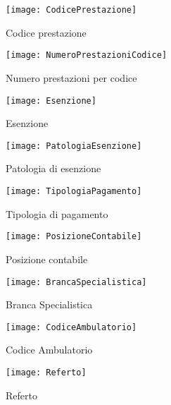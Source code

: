 \documentclass[paper=a4, fontsize=11pt]{scrartcl} %
\numberwithin{equation}{section} %
\numberwithin{figure}{section} %
\numberwithin{table}{section} %
\begin{document}
\begin{figure}
\begin{minipage} [t]{0.5\textwidth}
\centering
\texttt{[image: CodicePrestazione]}
\caption{Codice prestazione}\label{codiceprestazione}
\end{minipage}
\begin{minipage} [t]{0.5\textwidth}
\centering
\texttt{[image: NumeroPrestazioniCodice]}
\caption{Numero prestazioni per codice}\label{numeroprestazionicodice}
\end{minipage}
\begin{minipage} [t]{0.5\textwidth}
\centering
\texttt{[image: Esenzione]}
\caption{Esenzione}\label{esenzione}
\end{minipage}
\begin{minipage} [t]{0.5\textwidth}
\centering
\texttt{[image: PatologiaEsenzione]}
\caption{Patologia di esenzione}\label{patologiaesenzione}
\end{minipage}
\begin{minipage} [t]{0.5\textwidth}
\centering
\texttt{[image: TipologiaPagamento]}
\caption{Tipologia di pagamento}\label{tipologiapagamento}
\end{minipage}
\begin{minipage} [t]{0.5\textwidth}
\centering
\texttt{[image: PosizioneContabile]}
\caption{Posizione contabile}\label{posizionecontabile}
\end{minipage}
\end{figure}

\begin{figure}
\begin{minipage} [t]{0.5\textwidth}
\centering
\texttt{[image: BrancaSpecialistica]}
\caption{Branca Specialistica}\label{brancaspecialistica}
\end{minipage}
\begin{minipage} [t]{0.5\textwidth}
\centering
\texttt{[image: CodiceAmbulatorio]}
\caption{Codice Ambulatorio}\label{codiceambulatorio}
\end{minipage}
\begin{minipage} [t]{0.5\textwidth}
\centering
\texttt{[image: Referto]}
\caption{Referto}\label{referto}
\end{minipage}

\end{figure}
\newpage
\end{document}
